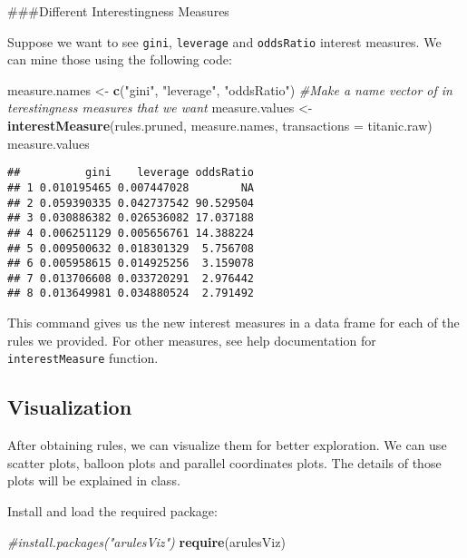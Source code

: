 \documentclass[]{article}
\newenvironment{Shaded}{\begin{snugshade}}{\end{snugshade}}
\newcommand{\CommentTok}[1]{\textcolor[rgb]{0.56,0.35,0.01}{\textit{#1}}}
\newcommand{\DataTypeTok}[1]{\textcolor[rgb]{0.13,0.29,0.53}{#1}}
\newcommand{\KeywordTok}[1]{\textcolor[rgb]{0.13,0.29,0.53}{\textbf{#1}}}
\newcommand{\NormalTok}[1]{#1}
\newcommand{\StringTok}[1]{\textcolor[rgb]{0.31,0.60,0.02}{#1}}
\begin{document}
\#\#\#Different Interestingness Measures

Suppose we want to see \texttt{gini}, \texttt{leverage} and
\texttt{oddsRatio} interest measures. We can mine those using the
following code:

\begin{Shaded}
\begin{Highlighting}[]
\NormalTok{measure.names <-}\StringTok{ }\KeywordTok{c}\NormalTok{(}\StringTok{"gini"}\NormalTok{, }\StringTok{"leverage"}\NormalTok{, }\StringTok{"oddsRatio"}\NormalTok{) }\CommentTok{#Make a name vector of in terestingness measures that we want}
\NormalTok{measure.values <-}\StringTok{ }\KeywordTok{interestMeasure}\NormalTok{(rules.pruned, measure.names, }\DataTypeTok{transactions =}\NormalTok{ titanic.raw)}
\NormalTok{measure.values}
\end{Highlighting}
\end{Shaded}

\begin{verbatim}
##          gini    leverage oddsRatio
## 1 0.010195465 0.007447028        NA
## 2 0.059390335 0.042737542 90.529504
## 3 0.030886382 0.026536082 17.037188
## 4 0.006251129 0.005656761 14.388224
## 5 0.009500632 0.018301329  5.756708
## 6 0.005958615 0.014925256  3.159078
## 7 0.013706608 0.033720291  2.976442
## 8 0.013649981 0.034880524  2.791492
\end{verbatim}

This command gives us the new interest measures in a data frame for each
of the rules we provided. For other measures, see help documentation for
\texttt{interestMeasure} function.

\hypertarget{visualization}{%
\subsection{Visualization}\label{visualization}}

After obtaining rules, we can visualize them for better exploration. We
can use scatter plots, balloon plots and parallel coordinates plots. The
details of those plots will be explained in class.

Install and load the required package:

\begin{Shaded}
\begin{Highlighting}[]
\CommentTok{#install.packages("arulesViz")}
\KeywordTok{require}\NormalTok{(arulesViz)}
\end{Highlighting}
\end{Shaded}
\end{document}
